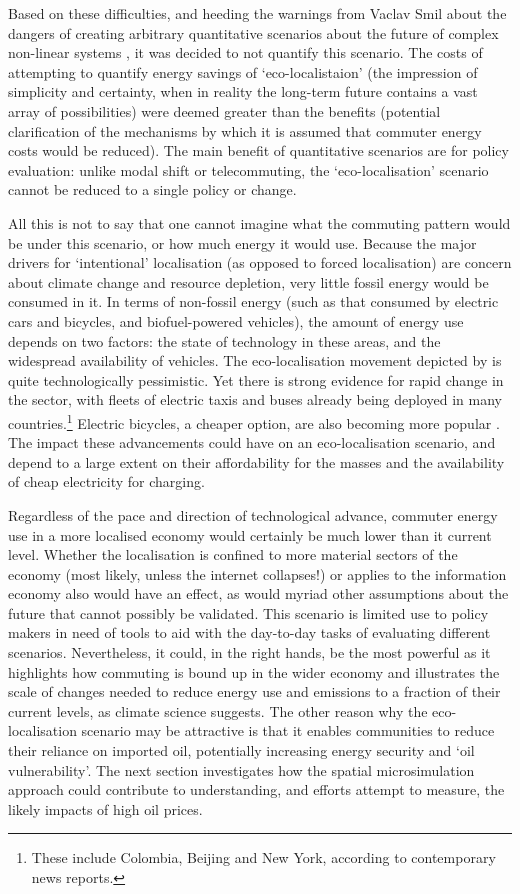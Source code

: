 \documentclass[a4paper, 11pt, twoside]{Thesis}
\begin{document}
Based on these difficulties, and heeding the warnings from Vaclav Smil about the dangers
of creating arbitrary quantitative scenarios about the future of complex non-linear systems
\citep{smil2000perils, Smil2008}, it was decided to not quantify this scenario.
The costs of attempting to quantify energy savings of `eco-localistaion'
(the impression of simplicity and certainty, when in reality the long-term future
contains a vast array of possibilities) were deemed greater
than the benefits (potential clarification of the mechanisms by which it is assumed that
commuter energy costs would be reduced). The main benefit of quantitative
scenarios are for policy evaluation: unlike modal shift or telecommuting,
the `eco-localisation' scenario cannot be reduced to a single policy or change.

All this is not to say that one cannot imagine what the commuting pattern would
be under this scenario, or how much energy it would use. Because the major drivers
for `intentional' localisation (as opposed to forced localisation) are
concern about climate change and resource depletion, very little
fossil energy would be consumed in it. In terms of non-fossil energy (such as
that consumed by electric cars and bicycles, and biofuel-powered vehicles),
the amount of energy use depends on two factors: the state of technology in
these areas, and the widespread availability of vehicles. The eco-localisation
movement depicted by \citet{North2010585} is quite technologically pessimistic.
Yet there is strong evidence for rapid change in the sector, with fleets of
electric taxis and buses already being deployed in many
countries.\footnote{These include Colombia, Beijing and New York, according
to contemporary news reports.
}
Electric bicycles, a cheaper option, are also becoming more popular \citep{Pierce2013}.
The impact these advancements could have on an eco-localisation scenario,
and depend to a large extent on their affordability for the masses and the
availability of cheap electricity for charging.

Regardless of the pace and direction of technological advance, commuter
energy use in a more localised economy would certainly be much lower than
it current level. Whether the localisation is confined to more material
sectors of the economy (most likely, unless the internet collapses!) or
applies to the information economy also would have an effect, as would
myriad other assumptions about the future that cannot possibly be validated.
This scenario is limited use to policy makers in need of tools to
aid with the day-to-day tasks of evaluating different scenarios.
Nevertheless, it could, in the right hands, be the most powerful as it
highlights how commuting is bound up in the wider economy and illustrates
the scale of changes needed to reduce energy use and emissions to a fraction
of their current levels, as climate science suggests. The other reason why
the eco-localisation scenario may be attractive is that it enables communities
to reduce their reliance on imported oil, potentially increasing energy
security and `oil vulnerability'. The next section investigates how
the spatial microsimulation approach could contribute to understanding,
and efforts attempt to measure, the likely impacts of high oil prices.
\end{document}
